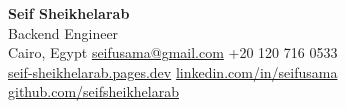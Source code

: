\begin{center}
  {\Huge \bfseries \textcolor{accent}{Seif Sheikhelarab}} \\[2pt]
  {\large Backend Engineer} \\[4pt]
  \small
  Cairo, Egypt \hspace{10pt}
  \href{mailto:seifusama@gmail.com}{seifusama@gmail.com} \hspace{10pt}
  +20 120 716 0533 \\
  \vspace{1pt}
  \href{https://seif-sheikhelarab.pages.dev/}{seif-sheikhelarab.pages.dev}
  \hspace{12pt}
  \href{https://linkedin.com/in/seifusama}{linkedin.com/in/seifusama}
  \hspace{12pt}
  \href{https://github.com/seifsheikhelarab}{github.com/seifsheikhelarab}
\end{center}